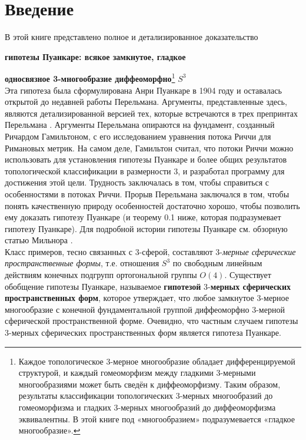 \section*{Введение}

В этой книге представлено полное и детализированное доказательство 

\hspace{1cm}\large\textbf{гипотезы Пуанкаре: всякое замкнутое, гладкое}

\hspace{1cm}\large\textbf{односвязное 3-многообразие диффеоморфно}\footnote{Каждое топологическое 3-мерное многообразие обладает дифференцируемой структурой, и каждый гомеоморфизм между гладкими 3-мерными многообразиями может быть сведён к диффеоморфизму. Таким образом, результаты классификации топологических 3-мерных многообразий до гомеоморфизма и гладких 3-мерных многообразий до диффеоморфизма эквивалентны. В этой книге под «многообразием» подразумевается «гладкое многообразие».} \large\textbf{$S^{3}$}\\
Эта гипотеза была сформулирована Анри Пуанкаре \cite{c58} в 1904 году и оставалась открытой 
до недавней работы Перельмана. Аргументы, представленные здесь, являются детализированной 
версией тех, которые встречаются в трех препринтах Перельмана \cite{c53, c55, c54}. 
Аргументы Перельмана опираются на фундамент, созданный Ричардом Гамильтоном, 
с его исследованием уравнения потока Риччи для Римановых метрик. 
На самом деле, Гамильтон считал, что потоки Риччи можно использовать 
для установления гипотезы Пуанкаре и более общих результатов топологической 
классификации в размерности 3, и разработал программу для достижения этой цели. 
Трудность заключалась в том, чтобы справиться с особенностями в потоках Риччи. 
Прорыв Перельмана заключался в том, чтобы понять качественную природу 
особенностей достаточно хорошо, чтобы позволить ему доказать гипотезу Пуанкаре 
(и теорему 0.1 ниже, которая подразумевает гипотезу Пуанкаре). 
Для подробной истории гипотезы Пуанкаре см. обзорную статью Мильнора \cite{c50}.\\

Класс примеров, тесно связанных с 3-сферой, составляют 3-\textit{мерные сферические 
пространственные формы}, т.е. отношения $S^{3}$ по свободным линейным действиям 
конечных подгрупп ортогональной группы $O(4)$. 
Существует обобщение гипотезы Пуанкаре, называемое \textbf{гипотезой} 3-\textbf{мерных 
сферических пространственных форм}, которое утверждает, что любое замкнутое 
3-мерное многообразие с конечной фундаментальной группой диффеоморфно 
3-мерной сферической пространственной форме. Очевидно, что частным случаем 
гипотезы 3-мерных сферических пространственных форм является гипотеза Пуанкаре.

